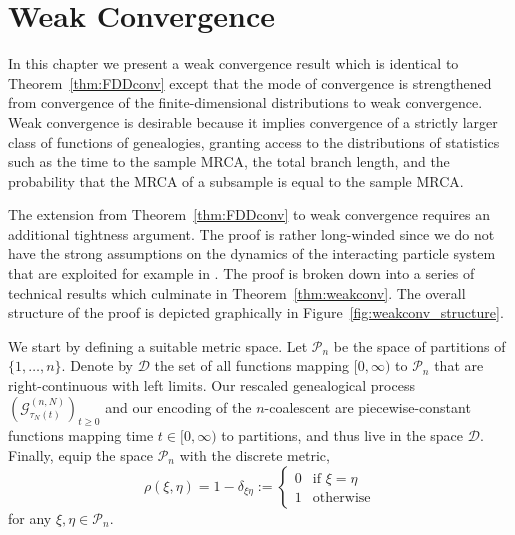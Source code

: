 \chapter{Weak Convergence} %
\label{ch:weakconv}


In this chapter we present a weak convergence result which is identical to Theorem~\ref{thm:FDDconv} except that the mode of convergence is strengthened from convergence of the finite-dimensional distributions to weak convergence. 
Weak convergence is desirable because it implies convergence of a strictly larger class of functions of genealogies, granting access to the distributions of statistics such as the time to the sample MRCA, the total branch length, and the probability that the MRCA of a subsample is equal to the sample MRCA.

The extension from Theorem~\ref{thm:FDDconv} to weak convergence requires an additional tightness argument. The proof is rather long-winded since we do not have the strong assumptions on the dynamics of the interacting particle system that are exploited for example in \textcite{mohle1999}. The proof is broken down into a series of technical results which culminate in Theorem~\ref{thm:weakconv}. The overall structure of the proof is depicted graphically in Figure~\ref{fig:weakconv_structure}.


We start by defining a suitable metric space.
Let $\mathcal{P}_n$ be the space of partitions of $\{1,\dots,n\}$.
Denote by $\mathcal{D}$ the set of all functions mapping $[0,\infty)$ to $\mathcal{P}_n$ that are right-continuous with left limits.
Our rescaled genealogical process $(\mathcal{G}^{(n,N)}_{\tau_N(t)})_{t\geq0}$ and our encoding of the $n$-coalescent are piecewise-constant functions mapping time $t\in[0,\infty)$ to partitions, and thus live in the space $\mathcal{D}$.
Finally, equip the space $\mathcal{P}_n$ with the discrete metric,
\begin{equation*}
\rho(\xi,\eta) 
= 1- \delta_{\xi\eta} 
:= \begin{cases}
    0 &\text{if } \xi=\eta \\
    1 &\text{otherwise}
\end{cases}
\end{equation*}
for any $\xi, \eta \in \mathcal{P}_n$.



